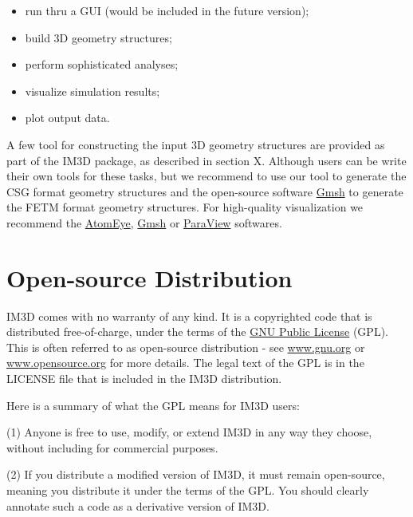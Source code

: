 \begin{itemize}

\item run thru a GUI (would be included in the future version);
\item build 3D geometry structures;
\item perform sophisticated analyses;
\item visualize simulation results;
\item plot output data.

\end{itemize}

A few tool for constructing the input 3D geometry structures are provided as part of the IM3D package, as described in section X. Although users can be write their own tools for these tasks, but we recommend to use our tool to generate the CSG format geometry structures and the open-source software \href{http://geuz.org/gmsh/}{Gmsh} to generate the FETM format geometry structures. For high-quality visualization we recommend the \href{http://li.mit.edu/Archive/Graphics/A/}{AtomEye}\cite{Li:2003}, \href{http://geuz.org/gmsh/}{Gmsh}\cite{Geuzaine:2009} or \href{http://www.paraview.org/}{ParaView} softwares.


\section{Open-source Distribution}

IM3D comes with no warranty of any kind. It is a copyrighted code that is distributed free-of-charge, under the terms of the \href{}{GNU Public License} (GPL). This is often referred to as open-source distribution - see \href{www.gnu.org}{www.gnu.org} or \href{www.opensource.org}{www.opensource.org} for more details. The legal text of the GPL is in the LICENSE file that is included in the IM3D distribution.

Here is a summary of what the GPL means for IM3D users:

(1) Anyone is free to use, modify, or extend IM3D in any way they choose, without including for commercial purposes.

(2) If you distribute a modified version of IM3D, it must remain open-source, meaning you distribute it under the terms of the GPL. You should clearly annotate such a code as a derivative version of IM3D.

